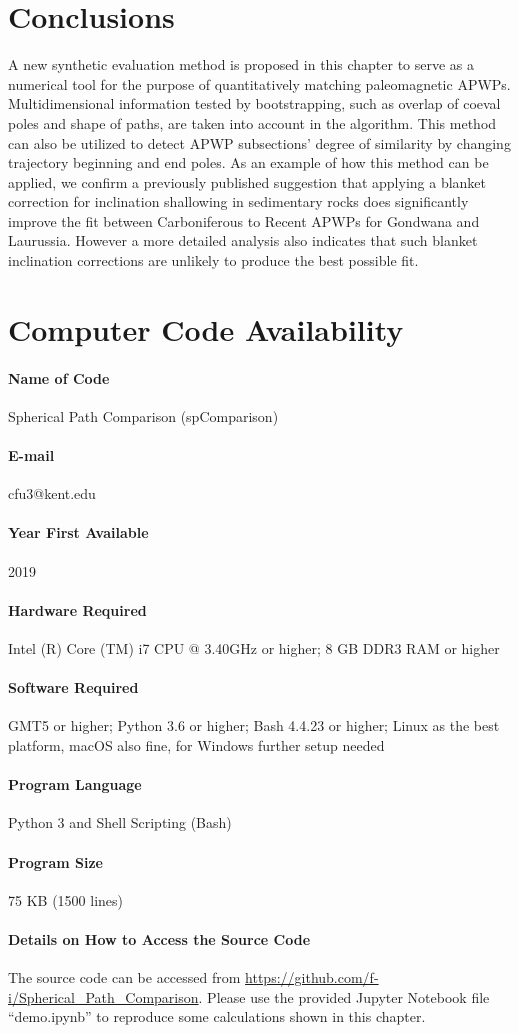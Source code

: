 \section{Conclusions}
A new synthetic evaluation method is proposed in this chapter to serve as a
numerical tool for the purpose of quantitatively matching paleomagnetic APWPs.
Multidimensional information tested by bootstrapping, such as overlap of coeval
poles and shape of paths, are taken into account in the algorithm. This method
can also be utilized to detect APWP subsections' degree of similarity by
changing trajectory beginning and end poles. As an example of how this method
can be applied, we confirm a previously published suggestion that applying a
blanket correction for inclination shallowing in sedimentary rocks does
significantly improve the fit between Carboniferous to Recent APWPs for Gondwana
and Laurussia. However a more detailed analysis also indicates that such blanket
inclination corrections are unlikely to produce the best possible fit.

\section*{Computer Code Availability}
\paragraph{Name of Code} Spherical Path Comparison (spComparison)
\paragraph{E-mail} cfu3@kent.edu
\paragraph{Year First Available} 2019
\paragraph{Hardware Required} Intel (R) Core (TM) i7 CPU @
3.40GHz or higher; 8 GB DDR3 RAM or higher
\paragraph{Software Required} GMT5 or higher; Python 3.6 or higher; Bash 4.4.23
or higher; Linux as the best platform, macOS also fine, for Windows further
setup needed
\paragraph{Program Language} Python 3 and Shell Scripting (Bash)
\paragraph{Program Size} 75 KB (1500 lines)
\paragraph{Details on How to Access the Source Code} The source code can be
accessed from \url{https://github.com/f-i/Spherical_Path_Comparison}. Please use
the provided Jupyter Notebook file ``demo.ipynb'' to reproduce some calculations
shown in this chapter.
